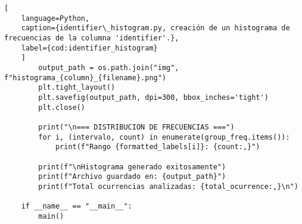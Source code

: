 \begin{lstlisting}[
    language=Python,
    caption={identifier\_histogram.py, creación de un histograma de frecuencias de la columna 'identifier'.},
    label={cod:identifier_histogram}
    ]
        output_path = os.path.join("img", f"histograma_{column}_{filename}.png")
        plt.tight_layout()
        plt.savefig(output_path, dpi=300, bbox_inches='tight')
        plt.close()
        
        print("\n=== DISTRIBUCION DE FRECUENCIAS ===")
        for i, (intervalo, count) in enumerate(group_freq.items()):
            print(f"Rango {formatted_labels[i]}: {count:,}")
        
        print(f"\nHistograma generado exitosamente")
        print(f"Archivo guardado en: {output_path}")
        print(f"Total ocurrencias analizadas: {total_ocurrence:,}\n")

    if __name__ == "__main__":
        main()
\end{lstlisting}
\vfill

